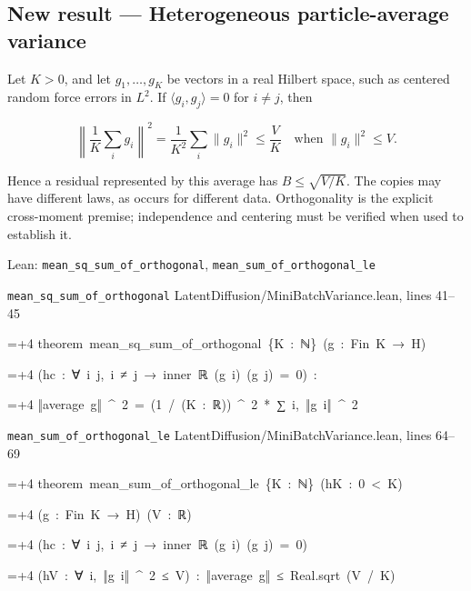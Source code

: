 \documentclass[11pt,a4paper]{report}
\newlength{\leancharwidth}
\newenvironment{leancode}{\par\smallskip\begingroup\ttfamily\footnotesize\raggedright
  \settowidth{\leancharwidth}{M}\setlength{\parskip}{0pt}\setlength{\parindent}{0pt}
  \frenchspacing}{\par\endgroup\smallskip}
\newcommand{\leanline}[2]{\hangindent=\dimexpr#1\leancharwidth+4\leancharwidth\relax
  \hangafter=1\noindent\hspace*{#1\leancharwidth}#2\par}
\newcommand{\leansource}[1]{\par{\footnotesize\color{leanmuted}#1}\par}
\begin{document}
\subsection{\texorpdfstring{New result — Heterogeneous particle-average variance}{New result — Heterogeneous particle-average variance}}



Let \(K>0\), and let \(g_1,\ldots,g_K\) be vectors in a real Hilbert space, such as centered random force errors in \(L^2\). If \(\langle g_i,g_j\rangle=0\) for \(i\ne j\), then



\[\left\|\frac1K\sum_i g_i\right\|^2=\frac1{K^2}\sum_i\|g_i\|^2\le\frac VK\quad\text{when }\|g_i\|^2\le V.\]



Hence a residual represented by this average has \(B\le\sqrt{V/K}\). The copies may have different laws, as occurs for different data. Orthogonality is the explicit cross-moment premise; independence and centering must be verified when used to establish it.

\begin{leanbox}{Lean: \texttt{mean\_\allowbreak{}sq\_\allowbreak{}sum\_\allowbreak{}of\_\allowbreak{}orthogonal}, \texttt{mean\_\allowbreak{}sum\_\allowbreak{}of\_\allowbreak{}orthogonal\_\allowbreak{}le}}
\leansource{\texttt{mean\_\allowbreak{}sq\_\allowbreak{}sum\_\allowbreak{}of\_\allowbreak{}orthogonal} \quad LatentDiffusion/\allowbreak{}MiniBatchVariance.lean, lines 41–45}
\begin{leancode}
\leanline{0}{theorem\ mean\_sq\_sum\_of\_orthogonal\ \{K\ :\ ℕ\}\ (g\ :\ Fin\ K\ →\ H)}
\leanline{4}{(hc\ :\ ∀\ i\ j,\ i\ ≠\ j\ →\ inner\ ℝ\ (g\ i)\ (g\ j)\ =\ 0)\ :}
\leanline{4}{‖average\ g‖\ \textasciicircum{}\ 2\ =\ (1\ /\ (K\ :\ ℝ))\ \textasciicircum{}\ 2\ *\ ∑\ i,\ ‖g\ i‖\ \textasciicircum{}\ 2}
\end{leancode}
\leansource{\texttt{mean\_\allowbreak{}sum\_\allowbreak{}of\_\allowbreak{}orthogonal\_\allowbreak{}le} \quad LatentDiffusion/\allowbreak{}MiniBatchVariance.lean, lines 64–69}
\begin{leancode}
\leanline{0}{theorem\ mean\_sum\_of\_orthogonal\_le\ \{K\ :\ ℕ\}\ (hK\ :\ 0\ <\ K)}
\leanline{4}{(g\ :\ Fin\ K\ →\ H)\ (V\ :\ ℝ)}
\leanline{4}{(hc\ :\ ∀\ i\ j,\ i\ ≠\ j\ →\ inner\ ℝ\ (g\ i)\ (g\ j)\ =\ 0)}
\leanline{4}{(hV\ :\ ∀\ i,\ ‖g\ i‖\ \textasciicircum{}\ 2\ ≤\ V)\ :\ ‖average\ g‖\ ≤\ Real.sqrt\ (V\ /\ K)}
\end{leancode}
\end{leanbox}
\end{document}
